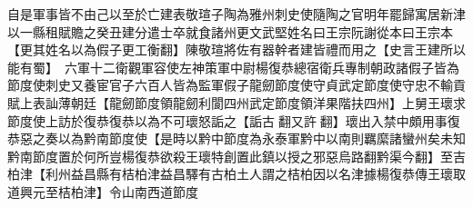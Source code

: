 自是軍事皆不由己以至於亡建表敬瑄子陶為雅州刺史使隨陶之官明年罷歸寓居新津以一縣租賦贍之癸丑建分遣士卒就食諸州更文武堅姓名曰王宗阮謝從本曰王宗本【更其姓名以為假子更工衡翻】陳敬瑄將佐有器幹者建皆禮而用之【史言王建所以能有蜀】　六軍十二衛觀軍容使左神策軍中尉楊復恭總宿衛兵專制朝政諸假子皆為節度使刺史又養宦官子六百人皆為監軍假子龍劒節度使守貞武定節度使守忠不輸貢賦上表訕薄朝廷【龍劒節度領龍劒利閬四州武定節度領洋果階扶四州】上舅王瓌求節度使上訪於復恭復恭以為不可瓌怒詬之【詬古翻又許翻】瓌出入禁中頗用事復恭惡之奏以為黔南節度使【是時以黔中節度為永泰軍黔中以南則羈縻諸蠻州矣未知黔南節度置於何所豈楊復恭欲殺王瓌特創置此鎮以授之邪惡烏路翻黔渠今翻】至吉柏津【利州益昌縣有桔柏津益昌驛有古柏土人謂之桔柏因以名津據楊復恭傳王瓌取道興元至桔柏津】令山南西道節度